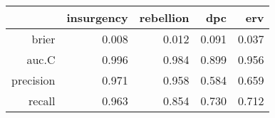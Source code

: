 \begin{tabular}{rrrrr}
  \hline
 & insurgency & rebellion & dpc & erv \\ 
  \hline
brier & 0.008 & 0.012 & 0.091 & 0.037 \\ 
  auc.C & 0.996 & 0.984 & 0.899 & 0.956 \\ 
  precision & 0.971 & 0.958 & 0.584 & 0.659 \\ 
  recall & 0.963 & 0.854 & 0.730 & 0.712 \\ 
   \hline
\end{tabular}
